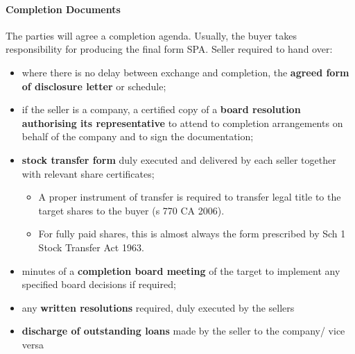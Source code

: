 \documentclass[
]{article}
\providecommand{\tightlist}{%
  \setlength{\itemsep}{0pt}\setlength{\parskip}{0pt}}
\begin{document}
\hypertarget{completion-documents}{%
\paragraph{Completion Documents}\label{completion-documents}}

The parties will agree a completion agenda. Usually, the buyer takes
responsibility for producing the final form SPA. Seller required to hand
over:

\begin{itemize}
\tightlist
\item
  where there is no delay between exchange and completion, the
  \textbf{agreed form of disclosure letter} or schedule;
\item
  if the seller is a company, a certified copy of a \textbf{board
  resolution authorising its representative} to attend to completion
  arrangements on behalf of the company and to sign the documentation;
\item
  \textbf{stock transfer form} duly executed and delivered by each
  seller together with relevant share certificates;

  \begin{itemize}
  \tightlist
  \item
    A proper instrument of transfer is required to transfer legal title
    to the target shares to the buyer (s 770 CA 2006).
  \item
    For fully paid shares, this is almost always the form prescribed by
    Sch 1 Stock Transfer Act 1963.
  \end{itemize}
\item
  minutes of a \textbf{completion board meeting} of the target to
  implement any specified board decisions if required;
\item
  any \textbf{written resolutions} required, duly executed by the
  sellers
\item
  \textbf{discharge of outstanding loans} made by the seller to the
  company/ vice versa


\end{itemize}
\end{document}
